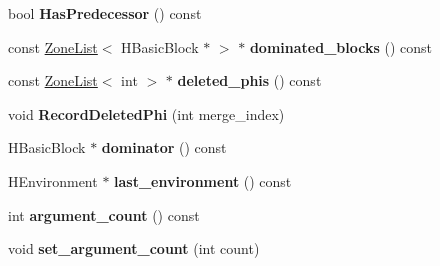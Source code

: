 \begin{DoxyCompactItemize}
\item 
\hypertarget{classv8_1_1internal_1_1_v8___f_i_n_a_l_ae38ce951d83f87d88380e7faed1405a2}{}bool {\bfseries Has\+Predecessor} () const \label{classv8_1_1internal_1_1_v8___f_i_n_a_l_ae38ce951d83f87d88380e7faed1405a2}

\item 
\hypertarget{classv8_1_1internal_1_1_v8___f_i_n_a_l_a125c1d837c16ab72686a0f584e29c765}{}const \hyperlink{classv8_1_1internal_1_1_zone_list}{Zone\+List}$<$ H\+Basic\+Block $\ast$ $>$ $\ast$ {\bfseries dominated\+\_\+blocks} () const \label{classv8_1_1internal_1_1_v8___f_i_n_a_l_a125c1d837c16ab72686a0f584e29c765}

\item 
\hypertarget{classv8_1_1internal_1_1_v8___f_i_n_a_l_a2edce8bfb98d5c7bdcb017f2a84fb057}{}const \hyperlink{classv8_1_1internal_1_1_zone_list}{Zone\+List}$<$ int $>$ $\ast$ {\bfseries deleted\+\_\+phis} () const \label{classv8_1_1internal_1_1_v8___f_i_n_a_l_a2edce8bfb98d5c7bdcb017f2a84fb057}

\item 
\hypertarget{classv8_1_1internal_1_1_v8___f_i_n_a_l_a79e1ec11b41a784b261ece434126643c}{}void {\bfseries Record\+Deleted\+Phi} (int merge\+\_\+index)\label{classv8_1_1internal_1_1_v8___f_i_n_a_l_a79e1ec11b41a784b261ece434126643c}

\item 
\hypertarget{classv8_1_1internal_1_1_v8___f_i_n_a_l_a35264b387c87004d1adcb346edaccb36}{}H\+Basic\+Block $\ast$ {\bfseries dominator} () const \label{classv8_1_1internal_1_1_v8___f_i_n_a_l_a35264b387c87004d1adcb346edaccb36}

\item 
\hypertarget{classv8_1_1internal_1_1_v8___f_i_n_a_l_a6460513fda677248d41192cb7b151af4}{}H\+Environment $\ast$ {\bfseries last\+\_\+environment} () const \label{classv8_1_1internal_1_1_v8___f_i_n_a_l_a6460513fda677248d41192cb7b151af4}

\item 
\hypertarget{classv8_1_1internal_1_1_v8___f_i_n_a_l_a8911e8df5837b07461822e3a1e9023f2}{}int {\bfseries argument\+\_\+count} () const \label{classv8_1_1internal_1_1_v8___f_i_n_a_l_a8911e8df5837b07461822e3a1e9023f2}

\item 
\hypertarget{classv8_1_1internal_1_1_v8___f_i_n_a_l_a536e6d4fcb93cd94708b58b0777faa9d}{}void {\bfseries set\+\_\+argument\+\_\+count} (int count)\label{classv8_1_1internal_1_1_v8___f_i_n_a_l_a536e6d4fcb93cd94708b58b0777faa9d}


\end{DoxyCompactItemize}

